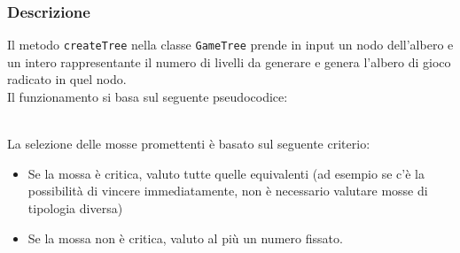 \documentclass[11pt]{article}
\begin{document}
\subsubsection*{Descrizione}
Il metodo \texttt{createTree} nella classe \texttt{GameTree} prende in input un nodo dell'albero e un intero rappresentante il numero di livelli da generare e genera l'albero di gioco radicato in quel nodo.\\
Il funzionamento si basa sul seguente pseudocodice:
\begin{algorithm*}
\SetAlgoLined
{}
\end{algorithm*}\\
La selezione delle mosse promettenti è basato sul seguente criterio:
\begin{itemize}
\setlength\itemsep{0.05cm}
	\item Se la mossa è critica, valuto tutte quelle equivalenti (ad esempio se c'è la possibilità di vincere immediatamente, non è necessario valutare mosse di tipologia diversa)
	\item Se la mossa non è critica, valuto al più un numero fissato.
\end{itemize}
\end{document}
